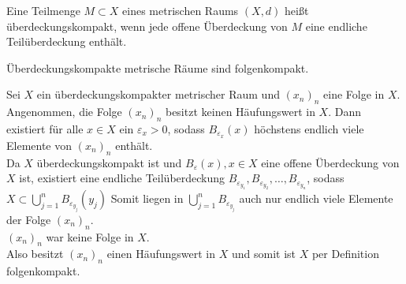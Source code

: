 \documentclass[../ana2u.tex]{subfiles}
\begin{document}
    \begin{defi}[Überdeckungskompakt]
        Eine Teilmenge \( M \subset X \) eines metrischen
        Raums \( (X,d) \) heißt überdeckungskompakt, 
        wenn jede offene Überdeckung von \(M\) eine 
        endliche Teilüberdeckung enthält.
    \end{defi}
    \begin{beh}
        Überdeckungskompakte metrische Räume sind
        folgenkompakt.
    \end{beh}
    \begin{bew}
        Sei \(X\) ein überdeckungskompakter metrischer Raum
        und \( (x_n)_n \) eine Folge in \(X\).\\
        Angenommen, die Folge \( (x_n)_n \) besitzt 
        keinen Häufungswert in \( X \). Dann existiert für alle 
        \( x \in X \) ein \( \varepsilon_x > 0 \), sodass 
        \( B_{\varepsilon_x}(x) \) höchstens endlich viele 
        Elemente von \( (x_n)_n \) enthält.\\
        Da \( X \) überdeckungskompakt ist und 
        \(B_\varepsilon(x), x \in X\) eine offene Überdeckung
        von \(X\) ist, existiert eine endliche
        Teilüberdeckung \( B_{\varepsilon_{y_1}}, 
        B_{\varepsilon_{y_2}}, \ldots, 
        B_{\varepsilon_{y_n}} \), sodass 
        \( X \subset \bigcup_{j=1}^n B_{\varepsilon_{y_j}}(y_j) \)        
        Somit liegen in \( \bigcup_{j=1}^n 
        B_{\varepsilon_{y_j}} \) auch nur endlich 
        viele Elemente der Folge \( (x_n)_n \). \Lightning{}\\
        \( (x_n)_n \) war keine Folge in \(X\).\\
        Also besitzt \( (x_n)_n \) einen 
        Häufungswert in \(X\) und somit ist \( X \) 
        per Definition folgenkompakt.
    \end{bew}
\end{document}
